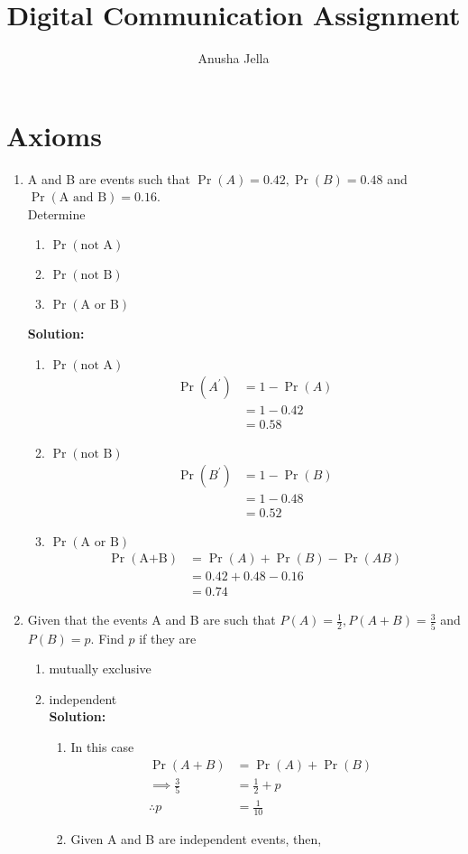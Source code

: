 \documentclass{article}
\title{Digital Communication Assignment}
\author{Anusha Jella}
\numberwithin{equation}{subsection}
\numberwithin{figure}{subsection}
\providecommand{\pr}[1]{\ensuremath{\Pr\left(#1\right)}}
\newcommand{\solution}{\noindent \textbf{Solution: }}
\begin{document}
\maketitle
\tableofcontents
\section{Axioms}
\begin{enumerate}%
\item A and B are events such that $\pr A=0.42, \pr B=0.48$ and $\pr {\text{A and B}}=0.16$. \\
Determine 
\begin{enumerate}
\item $\pr{\text{not A}}$ 
\item $\pr{\text{not B}}$  
\item $\pr{\text{A or B}}$ 
\end{enumerate}
\solution
\begin{enumerate}
\item $\pr{\text{not A}}$
\begin{align}
\pr{A^{\prime}} &= 1 - \pr A \\
&= 1 - 0.42 \\
&= 0.58 
\end{align}

\item $\pr{\text{not B}}$
\begin{align}
\pr{B^{\prime}} &= 1 - \pr B \\
&= 1 - 0.48 \\
&= 0.52
\end{align}

\item $\pr{\text{A or B}}$
\begin{align}
\pr{\text{A+B}} &= \pr A + \pr B - \pr {AB} \\
&= 0.42 + 0.48 - 0.16 \\
&= 0.74
\end{align}
\end{enumerate}
\item Given that the events A and B are such that $P(A)=\frac{1}{2}, P(A + B)=\frac{3}{5}$ and $P(B)=p$. Find $p$ if they are 
\begin{enumerate}
\item mutually exclusive
\item independent\\
\solution
\begin{enumerate}
	\item 
		In this case
\begin{align}
\pr{A + B} &=\pr{A} + \pr{B}&
\\
\implies \frac{3}{5}&=\frac{1}{2}+p&
\\
\therefore  p &= \frac{1}{10}&
\end{align}
\item 
Given A and B are independent events,
then,


\end{enumerate}
\end{enumerate}
\end{enumerate}
\end{document}
